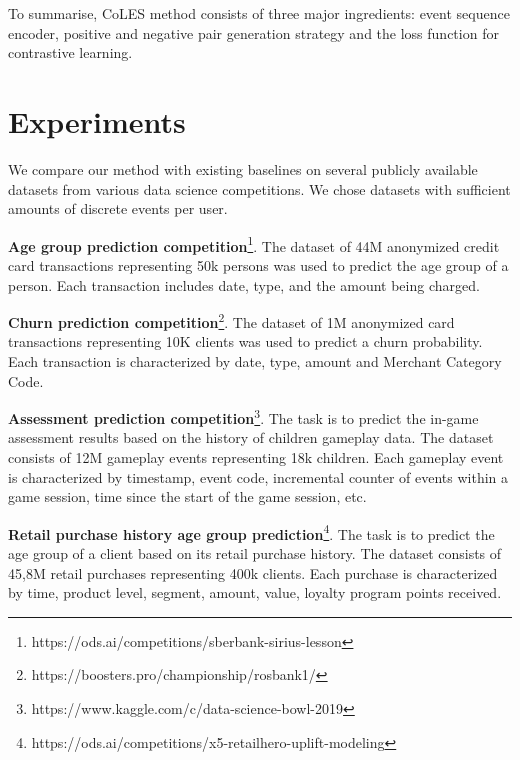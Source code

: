 \documentclass{article}
\begin{document}
To summarise, CoLES method consists of three major ingredients: event sequence encoder, positive and negative pair generation strategy and the loss function for contrastive learning.


\section{Experiments} \label{sec-exp}

We compare our method with existing baselines on several publicly available datasets from various data science competitions. We chose datasets with sufficient amounts of discrete events per user.

\textbf{Age group prediction competition}\footnote{https://ods.ai/competitions/sberbank-sirius-lesson}. The dataset of 44M anonymized credit card transactions representing 50k persons was used to predict the age group of a person. Each transaction includes date, type, and the amount being charged.


\textbf{Churn prediction competition}\footnote{https://boosters.pro/championship/rosbank1/}. The dataset of 1M anonymized card transactions representing 10K clients was used to predict a churn probability. Each transaction is characterized by date, type, amount and Merchant Category Code.

\textbf{Assessment prediction competition}\footnote{https://www.kaggle.com/c/data-science-bowl-2019}. The task is to predict the in-game assessment results based on the history of children gameplay data. The dataset consists of 12M gameplay events representing 18k children. Each gameplay event is characterized by timestamp, event code, incremental counter of events within a game session, time since the start of the game session, etc.

\textbf{Retail purchase history age group prediction}\footnote{https://ods.ai/competitions/x5-retailhero-uplift-modeling}. The task is to predict the age group of a client based on its retail purchase history. The dataset consists of 45,8M retail purchases representing 400k clients. Each purchase is characterized by time, product level, segment, amount, value, loyalty program points received.
\end{document}
